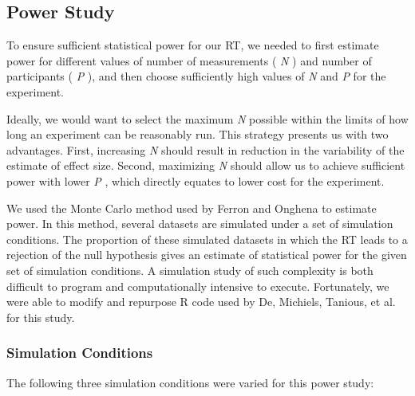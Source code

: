 \documentclass{article}
\begin{document}
\subsection{Power Study} 

To ensure sufficient statistical power for our RT, we needed to first estimate power for different values of number of measurements ( \emph{N} ) and number of participants ( \emph{P} ), and then choose sufficiently high values of \emph{N} and \emph{P} for the experiment. 

Ideally, we would want to select the maximum \emph{N} possible within the limits of how long an experiment can be reasonably run. This strategy presents us with two advantages. First, increasing \emph{N} should result in reduction in the variability of the estimate of effect size. Second, maximizing \emph{N} should allow us to achieve sufficient power with lower \emph{P} , which directly equates to lower cost for the experiment. 

We used the Monte Carlo method used by Ferron and Onghena \autocite{bib19} to estimate power. In this method, several datasets are simulated under a set of simulation conditions. The proportion of these simulated datasets in which the RT leads to a rejection of the null hypothesis gives an estimate of statistical power for the given set of simulation conditions. A simulation study of such complexity is both difficult to program and computationally intensive to execute. Fortunately, we were able to modify and repurpose R code used by De, Michiels, Tanious, et al. \autocite{bib39} for this study. 

\subsubsection{Simulation Conditions} 

The following three simulation conditions were varied for this power study:
\end{document}
